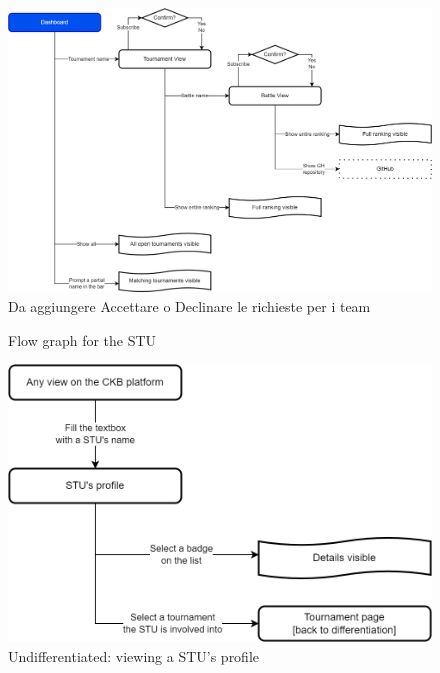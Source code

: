 \begin{figure}[H]
    \centering
    \includegraphics[width=\textwidth]{images/UX/UX-STU.drawio.png}
    {\color{red} Da aggiungere Accettare o Declinare le richieste per i team}
    \caption{Flow graph for the STU}
\end{figure}

\begin{figure}[H]
    \centering
    \includegraphics[width=\textwidth]{images/UX/UX-STU_profile.drawio.png}
    \caption{Undifferentiated: viewing a STU's profile}
\end{figure}